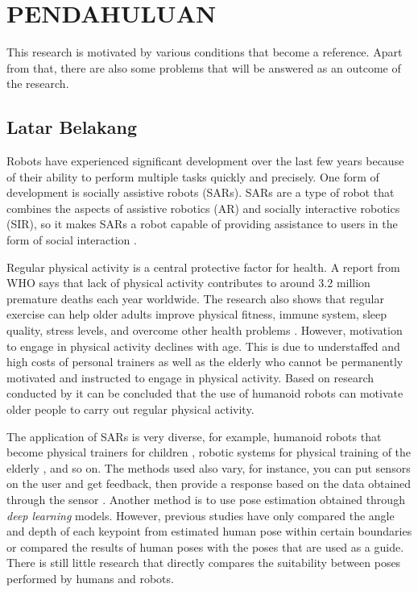 \chapter{PENDAHULUAN}
\label{chap:pendahuluan}

This research is motivated by various conditions that become a reference. Apart from that, there are also some problems that
will be answered as an outcome of the research.

\section{Latar Belakang}
\label{sec:latarbelakang}

Robots have experienced significant development over the last few years 
because of their ability to perform multiple tasks quickly and precisely.
One form of development is socially assistive robots (SARs). 
SARs are a type of robot that combines the aspects of assistive robotics (AR)
and socially interactive robotics (SIR), so it makes SARs a robot capable of providing assistance to users in the form of social interaction \parencite{feil2005}.

Regular physical activity is a central protective factor for health.
A report from WHO says that lack of physical activity contributes to around 3.2 million premature deaths each year worldwide.
The research also shows that regular exercise can help older adults improve physical fitness, immune system, sleep quality, stress levels, and overcome other health problems \parencite{lotfi2018}.
However, motivation to engage in physical activity declines with age. 
This is due to understaffed and high costs of personal trainers as well as the elderly who cannot be permanently motivated and instructed to engage in physical activity.
Based on research conducted by \parencite{ruf2020} it can be concluded that the use of humanoid robots can motivate older people to carry out regular physical activity.

The application of SARs is very diverse, for example, humanoid robots that become physical trainers for children \parencite{güneysu2017}, 
robotic systems for physical training of the elderly \parencite{avioz2021}, and so on. The methods used also vary, for instance, 
you can put sensors on the user and get feedback, then provide a response based on the data obtained through the sensor \parencite{güneysu2017}. 
Another method is to use pose estimation obtained through \emph{deep learning} models.
However, previous studies have only compared the angle and depth of each keypoint from estimated human pose within certain boundaries or compared the results of human poses with the poses that are used as a guide. \parencite{romeo}
There is still little research that directly compares the suitability between poses performed by humans and robots.

